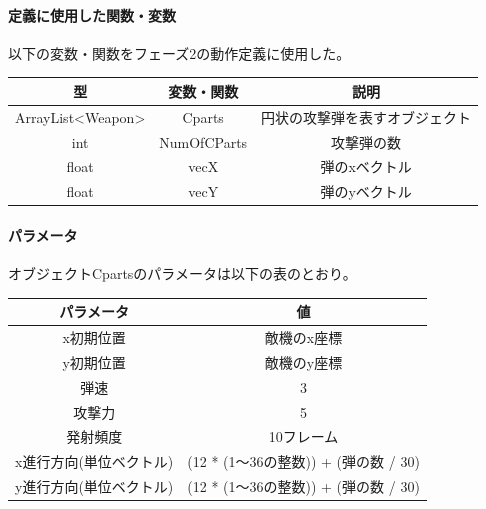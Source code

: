\documentclass[a4paper,titlepage,11pt]{ltjsarticle}
\begin{document}
\paragraph{定義に使用した関数・変数}
以下の変数・関数をフェーズ2の動作定義に使用した。
\begin{table}[H]
	\centering
	\begin{tabular}{|c|c|c|}
		\hline
		型 & 変数・関数 & 説明\\ \hline \hline
		ArrayList<Weapon> & Cparts & 円状の攻撃弾を表すオブジェクト\\ \hline
		int & NumOfCParts & 攻撃弾の数\\ \hline
		float & vecX & 弾のxベクトル \\ \hline
		float & vecY & 弾のyベクトル \\ \hline
	\end{tabular}
\end{table}
\paragraph{パラメータ}
	オブジェクトCpartsのパラメータは以下の表のとおり。
	\begin{table}[H]
		\centering
		\begin{tabular}{|c|c|}
			\hline
			パラメータ & 値\\ \hline \hline
			x初期位置 & 敵機のx座標 \\ \hline
			y初期位置 & 敵機のy座標 \\ \hline
			弾速 & 3 \\ \hline
			攻撃力 & 5 \\ \hline
			発射頻度 & 10フレーム\\ \hline
			x進行方向(単位ベクトル) & (12 * (1～36の整数)) + (弾の数 / 30) \\ \hline
			y進行方向(単位ベクトル) & (12 * (1～36の整数)) + (弾の数 / 30) \\ \hline
		\end{tabular}
	\end{table}
\end{document}
